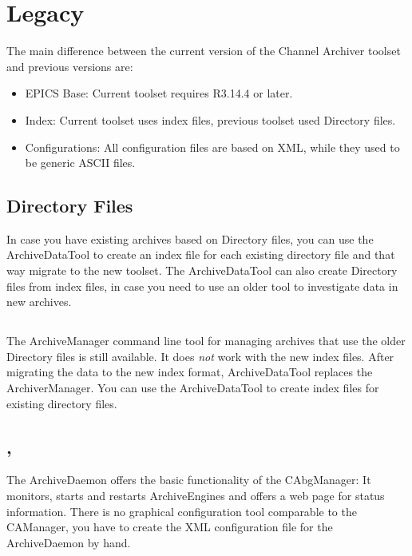 \chapter{Legacy}
The main difference between the current version of the Channel Archiver toolset
and previous versions are:
\begin{itemize}
\item EPICS Base: Current toolset requires R3.14.4 or later.
\item Index: Current toolset uses index files, previous toolset
      used Directory files.
\item Configurations: All configuration files are based on XML,
      while they used to be generic ASCII files.
\end{itemize}

\section{Directory Files}
In case you have existing archives based on Directory files,
you can use the ArchiveDataTool to create an index file for each existing directory file
and that way migrate to the new toolset.
The ArchiveDataTool can also create Directory files from index files, in case you
need to use an older tool to investigate data in new archives.

\section{}
The ArchiveManager command line tool for managing archives that use the
older Directory files is still available.
It does \emph{not} work with the new index files.
After migrating the data to the new index format,
ArchiveDataTool replaces the ArchiverManager. You can use the ArchiveDataTool
to create index files for existing directory files.

\section{, }
The ArchiveDaemon offers the basic functionality of the CAbgManager:
It monitors, starts and restarts ArchiveEngines and offers a web page
for status information.
There is no graphical configuration tool comparable to the CAManager,
you have to create the XML configuration file for the ArchiveDaemon
by hand.

